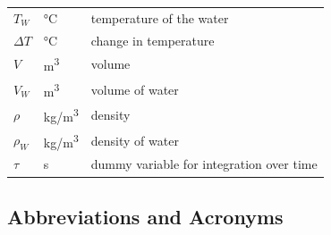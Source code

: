\documentclass[12pt]{article}
\newcommand{\blt}{- } %
\begin{document}
\begin{longtable*}{l l p{12cm}}
  $T_W$ & \si[per-mode=symbol] {\celsius} & temperature of the water
  \\
  $\Delta T$ & \si[per-mode=symbol] {\celsius} & change in temperature
  \\
  $V$ & \si[per-mode=symbol] {\cubic\meter} & volume
  \\
  $V_W$ & \si[per-mode=symbol] {\cubic\meter} & volume of water
  \\
  $\rho$ & \si[per-mode=symbol] {\kilogram\per\cubic\metre} & density
  \\
  $\rho_W$ & \si[per-mode=symbol] {\kilogram\per\cubic\metre} & density of water
  \\
  $\tau$ & \si[per-mode=symbol] {\second} & dummy variable for integration over time
  \\
  \bottomrule
\end{longtable*}



\subsection{Abbreviations and Acronyms}
\end{document}
